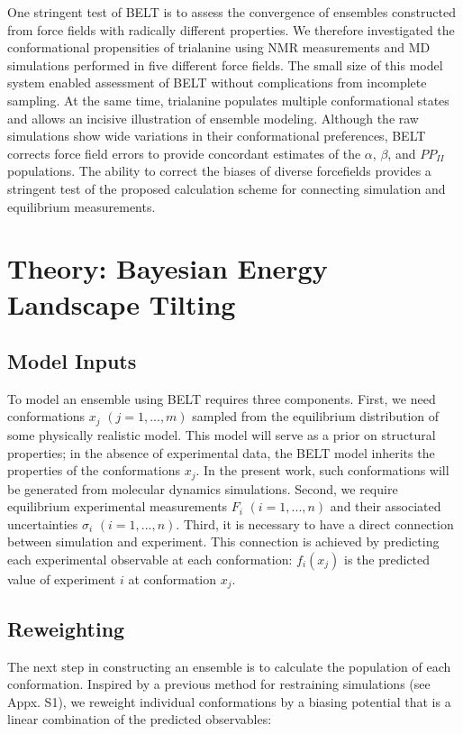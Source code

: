 \documentclass[journal=jacsat,manuscript=article]{achemso}
\begin{document}
One stringent test of BELT is to assess the convergence of ensembles constructed from force fields with radically different properties.  We therefore investigated the conformational propensities of trialanine using NMR measurements \cite{Graf2007} and MD simulations performed in five different force fields.  The small size of this model system enabled assessment of BELT without complications from incomplete sampling.  At the same time, trialanine populates multiple conformational states and allows an incisive illustration of ensemble modeling.  Although the raw simulations show wide variations in their conformational preferences, BELT corrects force field errors to provide concordant estimates of the $\alpha$, $\beta$, and $PP_{II}$ populations.  The ability to correct the biases of diverse forcefields provides a stringent test of the proposed calculation scheme for connecting simulation and equilibrium measurements. 


\section*{Theory: Bayesian Energy Landscape Tilting}

\subsection*{Model Inputs}

To model an ensemble using BELT requires three components.  First, we need conformations $x_j$  $(j = 1 , ... , m)$ sampled from the equilibrium distribution of some physically realistic model.  This model will serve as a prior on structural properties; in the absence of experimental data, the BELT model inherits the properties of the conformations $x_j$.  In the present work, such conformations will be generated from molecular dynamics simulations.  Second, we require equilibrium experimental measurements $F_i$ $(i = 1 , ... , n)$ and their associated uncertainties $\sigma_i$ $(i = 1 , ... , n)$.  Third, it is necessary to have a direct connection between simulation and experiment.  This connection is achieved by predicting each experimental observable at each conformation: $f_i(x_j)$ is the predicted value of experiment $i$ at conformation $x_j$.  

\subsection*{Reweighting}

The next step in constructing an ensemble is to calculate the population of each conformation.  Inspired by a previous method for restraining simulations  \cite{chodera2012} (see Appx. S1), we reweight individual conformations by a biasing potential that is a linear combination of the predicted observables:
\end{document}
